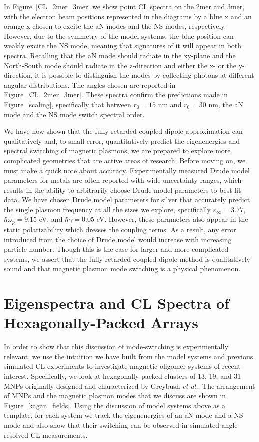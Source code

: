 \documentclass[journal=apchd5,manuscript=article]{achemso}
\begin{document}
In Figure~\ref{CL_2mer_3mer} we show point CL spectra on the 2mer and 3mer, with the electron beam positions represented in the diagrams by a blue x and  an orange x chosen to excite the aN modes and the NS modes, respectively. However, due to the symmetry of the model systems, the blue position can weakly excite the NS mode, meaning that signatures of it will appear in both spectra. Recalling that the aN mode should radiate in the xy-plane and the North-South mode should radiate in the z-direction and either the x- or the y- direction, it is possible to distinguish the modes by collecting photons at different angular distributions. The angles chosen are reported in Figure~\ref{CL_2mer_3mer}. These spectra confirm the predictions made in Figure~\ref{scaling}, specifically that between $r_0 = 15$ nm and $r_0 = 30$ nm, the aN mode and the NS mode switch spectral order.

We have now shown that the fully retarded coupled dipole approximation can qualitatively and, to small error, quantitatively predict the eigenenergies and spectral switching of magnetic plasmons, we are prepared to explore more complicated geometries that are active areas of research. Before moving on, we must make a quick note about accuracy. Experimentally measured Drude model parameters for metals are often reported with wide uncertainty ranges, which results in the ability to arbitrarily choose Drude model parameters to best fit data\cite{Raschke2015}. We have chosen Drude model parameters for silver that accurately predict the single plasmon frequency at all the sizes we explore, specifically $\varepsilon_{\infty} = 3.77$, $\hbar\omega_p = 9.15$ eV, and $\hbar\gamma = 0.05$ eV. However, these parameters also appear in the static polarizability which dresses the coupling terms. As a result, any error introduced from the choice of Drude model would increase with increasing particle number. Though this is the case for larger and more complicated systems, we assert that the fully retarded coupled dipole method is qualitatively sound and that magnetic plasmon mode switching is a physical phenomenon.

\section{Eigenspectra and CL Spectra of Hexagonally-Packed Arrays}

In order to show that this discussion of mode-switching is experimentally relevant, we use the intuition we have built from the model systems and previous simulated CL experiments to investigate magnetic oligomer systems of recent interest. Specifically, we look at hexagonally packed clusters of 13, 19, and 31 MNPs originally designed and characterized by Greybush \textit{et al.}\cite{Engheta2017}. The arrangement of MNPs and the magnetic plasmon modes that we discuss are shown in Figure~\ref{kagan_fields}. Using the discussion of model systems above as a template, for each system we track the eigenenergies of an aN mode and a NS mode and also show that their switching can be observed in simulated angle-resolved CL measurements.
\end{document}
